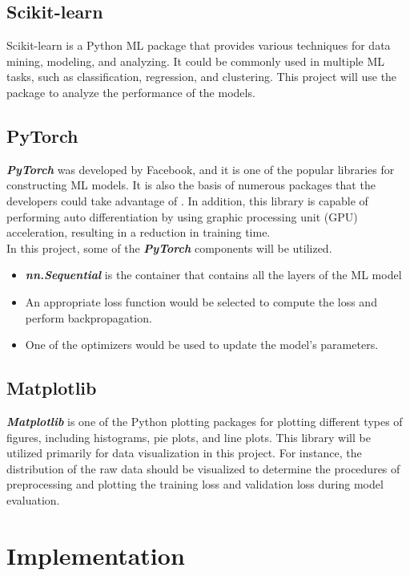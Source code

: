 \documentclass[12pt,twoside]{report}
\begin{document}
\section{Scikit-learn}
Scikit-learn is a Python ML package that provides various techniques for data mining, modeling, and analyzing. It could be commonly used in multiple ML tasks, such as classification, regression, and clustering. This project will use the package to analyze the performance of the models.

\section{PyTorch}
\textbf{\textit{PyTorch}} was developed by Facebook, and it is one of the popular libraries for constructing ML models. It is also the basis of numerous packages that the developers could take advantage of \citep{RN5}. In addition, this library is capable of performing auto differentiation by using graphic processing unit (GPU) acceleration, resulting in a reduction in training time. 
\\

In this project, some of the \textbf{\textit{PyTorch}} components will be utilized.
\begin{itemize}
	\item \textbf{\textit{nn.Sequential}} is the container that contains all the layers of the ML model
	\item An appropriate loss function would be selected to compute the loss and perform backpropagation. 
	\item One of the optimizers would be used to update the model's parameters. 
\end{itemize}

\section{Matplotlib}
\textbf{\textit{Matplotlib}} is one of the Python plotting packages for plotting different types of figures, including histograms, pie plots, and line plots. This library will be utilized primarily for data visualization in this project. For instance, the distribution of the raw data should be visualized to determine the procedures of preprocessing and plotting the training loss and validation loss during model evaluation. 

\chapter{Implementation}
\end{document}
